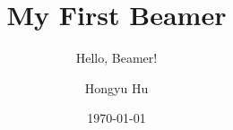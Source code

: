 \documentclass[
11pt,
ignorenonframetext,
]{beamer}
\title[huhy.rbind.io]{My First Beamer}
\subtitle{Hello, Beamer!}
\author[\parbox{.1\paperwidth}{\raggedleft   huhy \\ jun3970 }]{Hongyu Hu}
\institute[JNU]{Jinan University}
\date{\today}
\begin{document}
\begin{frame}
\titlepage
\end{frame}
\end{document}
